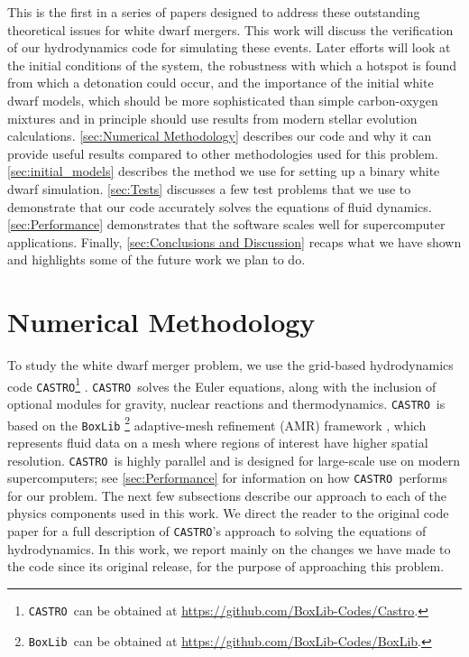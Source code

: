 \documentclass[iop]{../emulateapj}
\newcommand{\boxlib}{\texttt{BoxLib}}
\newcommand{\castro}{\texttt{CASTRO}}
\begin{document}
This is the first in a series of papers designed to address these
outstanding theoretical issues for white dwarf mergers. This work will
discuss the verification of our hydrodynamics code for simulating
these events. Later efforts will look at the initial conditions of the
system, the robustness with which a hotspot is found from which a
detonation could occur, and the importance of the initial white dwarf
models, which should be more sophisticated than simple carbon-oxygen
mixtures and in principle should use results from modern stellar
evolution calculations. \autoref{sec:Numerical Methodology}
describes our code and why it can provide useful results compared to
other methodologies used for this problem. 
\autoref{sec:initial_models} describes the method we use for setting up a
binary white dwarf simulation. \autoref{sec:Tests} discusses a few
test problems that we use to demonstrate that our code accurately
solves the equations of fluid dynamics. \autoref{sec:Performance}
demonstrates that the software scales well for supercomputer
applications. Finally, \autoref{sec:Conclusions and Discussion}
recaps what we have shown and highlights some of the future work we
plan to do.

\section{Numerical Methodology}\label{sec:Numerical Methodology}

To study the white dwarf merger problem, we use the grid-based
hydrodynamics code \castro\footnote{\castro\ can be obtained at \url{https://github.com/BoxLib-Codes/Castro}.} \citep{castro}.
\castro\ solves the Euler
equations, along with the inclusion of optional modules for gravity,
nuclear reactions and thermodynamics. \castro\ is based on the \boxlib
\footnote{\boxlib\ can be obtained at \url{https://github.com/BoxLib-Codes/BoxLib}.}
adaptive-mesh refinement (AMR) framework \citep{rendleman:2000}, which
represents fluid data on a mesh where regions of interest have higher
spatial resolution. \castro\ is highly parallel and is designed for
large-scale use on modern supercomputers; see 
\autoref{sec:Performance} for information on how \castro\ performs for our
problem. The next few subsections describe our approach to each of the
physics components used in this work. We direct the reader to the
original code paper for a full description of \castro's approach to
solving the equations of hydrodynamics. In this work, we report mainly
on the changes we have made to the code since its original release,
for the purpose of approaching this problem.
\end{document}
